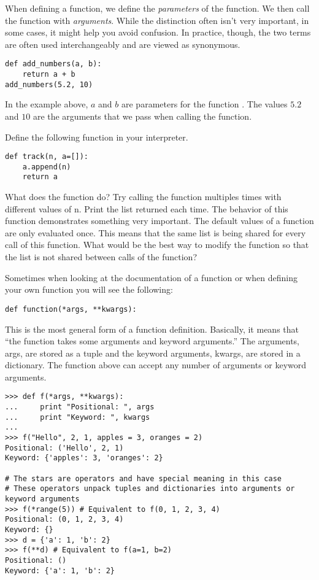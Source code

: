 \begin{example}
\begin{info}
When defining a function, we define the \emph{parameters} of the function.  We then call the function with \emph{arguments}.
While the distinction often isn't very important, in some cases, it might help you avoid confusion.
In practice, though, the two terms are often used interchangeably and are viewed as synonymous.
\begin{lstlisting}
def add_numbers(a, b):
    return a + b
add_numbers(5.2, 10)
\end{lstlisting}
In the example above, $a$ and $b$ are parameters for the function .
The values $5.2$ and $10$ are the arguments that we pass when calling the function.
\end{info}

\begin{problem}
Define the following function in your interpreter.
\begin{lstlisting}
def track(n, a=[]):
    a.append(n)
    return a
\end{lstlisting}
What does the function do?
Try calling the function multiples times with different values of n.
Print the list returned each time.
The behavior of this function demonstrates something very important.
The default values of a function are only evaluated once.
This means that the same list is being shared for every call of this function.
What would be the best way to modify the function so that the list is not shared between calls of the function?
\end{problem}

Sometimes when looking at the documentation of a function or when defining your own function you will see the following:
\begin{lstlisting}
def function(*args, **kwargs):
\end{lstlisting}
This is the most general form of a function definition.
Basically, it means that ``the function takes some arguments and keyword arguments.''
The arguments, args, are stored as a tuple and the keyword arguments, kwargs, are stored in a dictionary.
The function above can accept any number of arguments or keyword arguments.
\begin{lstlisting}
>>> def f(*args, **kwargs):
...     print "Positional: ", args
...     print "Keyword: ", kwargs
...     
>>> f("Hello", 2, 1, apples = 3, oranges = 2)
Positional: ('Hello', 2, 1)
Keyword: {'apples': 3, 'oranges': 2}

# The stars are operators and have special meaning in this case
# These operators unpack tuples and dictionaries into arguments or keyword arguments
>>> f(*range(5)) # Equivalent to f(0, 1, 2, 3, 4)
Positional: (0, 1, 2, 3, 4)
Keyword: {}
>>> d = {'a': 1, 'b': 2}
>>> f(**d) # Equivalent to f(a=1, b=2)
Positional: ()
Keyword: {'a': 1, 'b': 2}
\end{lstlisting}
\end{example}

